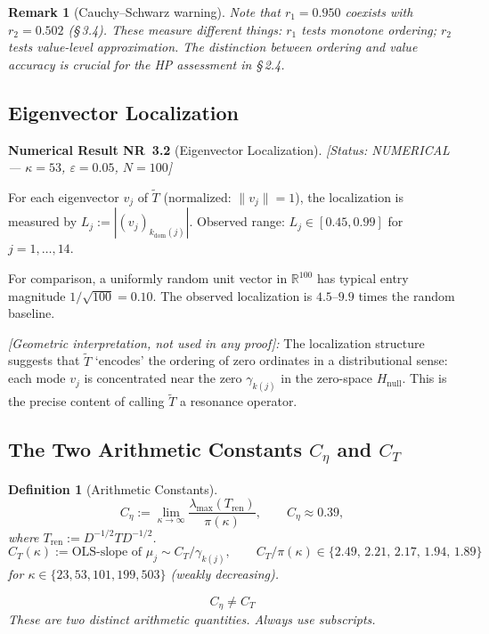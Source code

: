 \documentclass[11pt]{article}
\newtheorem{definition}[theorem]{Definition}
\newtheorem*{remark}{Remark}
\newcommand{\Hnull}{H_{\mathrm{null}}}
\newcommand{\Tren}{T_{\mathrm{ren}}}
\newcommand{\Tt}{\widetilde{T}}
\newcommand{\Ceta}{C_{\eta}}
\newcommand{\CT}{C_{T}}
\newcommand{\kdom}{k_{\mathrm{dom}}}
\begin{document}
\begin{remark}[Cauchy--Schwarz warning]
Note that $r_1 = 0.950$ coexists with $r_2 = 0.502$ (\S\,3.4).
These measure different things: $r_1$ tests monotone ordering;
$r_2$ tests value-level approximation.
The distinction between ordering and value accuracy is crucial for
the HP assessment in \S\,2.4.
\end{remark}

\subsection{Eigenvector Localization}

\textbf{Numerical Result NR~3.2} (Eigenvector Localization).
\emph{[Status: NUMERICAL --- $\kappa=53$, $\varepsilon=0.05$, $N=100$]}

For each eigenvector $v_j$ of $\Tt$ (normalized: $\|v_j\|=1$),
the localization is measured by $L_j := |(v_j)_{\kdom(j)}|$.
Observed range: $L_j\in[0.45,0.99]$ for $j=1,\ldots,14$.

For comparison, a uniformly random unit vector in $\mathbb{R}^{100}$
has typical entry magnitude $1/\sqrt{100} = 0.10$.
The observed localization is $4.5$--$9.9$ times the random baseline.

\emph{[Geometric interpretation, not used in any proof]:}
The localization structure suggests that $\Tt$ `encodes'
the ordering of zero ordinates in a distributional sense:
each mode $v_j$ is concentrated near the zero $\gamma_{k(j)}$
in the zero-space $\Hnull$.
This is the precise content of calling $\Tt$ a resonance operator.

\subsection{The Two Arithmetic Constants $\Ceta$ and $\CT$}

\begin{definition}[Arithmetic Constants]\label{def:constants}
\[
\Ceta := \lim_{\kappa\to\infty}\frac{\lambda_{\max}(\Tren)}{\pi(\kappa)},
\qquad\Ceta\approx 0.39,
\]
where $\Tren := D^{-1/2}TD^{-1/2}$.
\[
\CT(\kappa) := \text{OLS-slope of } \mu_j\sim\CT/\gamma_{k(j)},
\qquad \CT/\pi(\kappa) \in \{2.49,\,2.21,\,2.17,\,1.94,\,1.89\}
\]
for $\kappa\in\{23,53,101,199,503\}$ (weakly decreasing).

\[
\boxed{\Ceta \neq \CT}
\]
\emph{These are two distinct arithmetic quantities. Always use subscripts.}
\end{definition}
\end{document}
